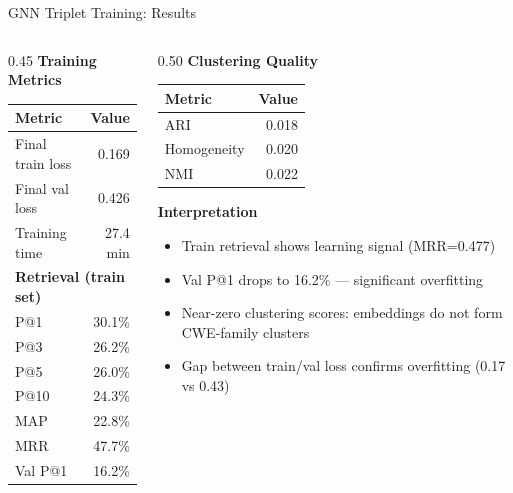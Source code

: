 \documentclass[aspectratio=169,10pt]{beamer}
\newcommand{\chit}[1]{\cellcolor{hit!30} #1}
\newcommand{\cmiss}[1]{\cellcolor{miss!25} #1}
\newcommand{\cwarn}[1]{\cellcolor{warn!30} #1}
\begin{document}
\begin{frame}{GNN Triplet Training: Results}

  \centering
  \vspace{0.3em}
  \begin{columns}[T]
  \begin{column}{0.45\textwidth}
    {\small\textbf{Training Metrics}}\\[6pt]
    {\scriptsize
    \renewcommand{\arraystretch}{1.3}
    \begin{tabular}{lr}
      \toprule
      \textbf{Metric} & \textbf{Value} \\
      \midrule
      Final train loss & 0.169 \\
      Final val loss & 0.426 \\
      Training time & 27.4 min \\
      \midrule
      \multicolumn{2}{l}{\textbf{Retrieval (train set)}} \\
      \midrule
      P@1 & \cwarn{30.1\%} \\
      P@3 & 26.2\% \\
      P@5 & 26.0\% \\
      P@10 & 24.3\% \\
      MAP & 22.8\% \\
      MRR & \chit{47.7\%} \\
      \midrule
      Val P@1 & \cmiss{16.2\%} \\
      \bottomrule
    \end{tabular}}
  \end{column}
  \begin{column}{0.50\textwidth}
    {\small\textbf{Clustering Quality}}\\[6pt]
    {\scriptsize
    \renewcommand{\arraystretch}{1.3}
    \begin{tabular}{lr}
      \toprule
      \textbf{Metric} & \textbf{Value} \\
      \midrule
      ARI & 0.018 \\
      Homogeneity & 0.020 \\
      NMI & 0.022 \\
      \bottomrule
    \end{tabular}}

    \vspace{1em}
    {\small\textbf{Interpretation}}\\[4pt]
    {\scriptsize
    \begin{itemize}\itemsep2pt
      \item Train retrieval shows learning signal (MRR=0.477)
      \item Val P@1 drops to 16.2\% — significant overfitting
      \item Near-zero clustering scores: embeddings do not form CWE-family clusters
      \item Gap between train/val loss confirms overfitting (0.17 vs 0.43)
    \end{itemize}}
  \end{column}
  \end{columns}
\end{frame}
\end{document}

